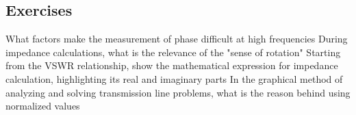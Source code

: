 \begin{mdframed}[ backgroundcolor=lightblue, linewidth=1pt, hidealllines=true]
\section*{Exercises}
\begin{ExerciseList}
\Exercise[label={ex91}]
What factors make the measurement of phase difficult at high frequencies
\Exercise[label={ex91}]
During impedance calculations, what is the relevance of the "sense of rotation"
\Exercise[label={ex91}]
Starting from the VSWR relationship, show the mathematical expression for impedance calculation, highlighting its real and imaginary parts
\Exercise[label={ex91}]
In the graphical method of analyzing and solving transmission line problems, what is the reason behind using normalized values
\end{ExerciseList}
\end{mdframed}
